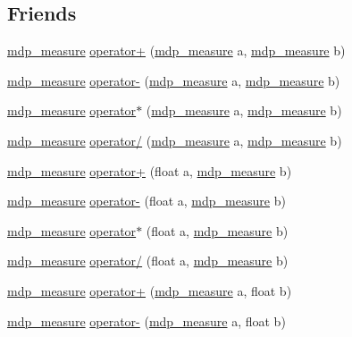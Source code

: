 \subsection*{Friends}
\begin{DoxyCompactItemize}
\item 
\hyperlink{classmdp__measure}{mdp\+\_\+measure} \hyperlink{classmdp__measure_a1550c5a752f0e131323a0571cb75a1ed}{operator+} (\hyperlink{classmdp__measure}{mdp\+\_\+measure} a, \hyperlink{classmdp__measure}{mdp\+\_\+measure} b)
\item 
\hyperlink{classmdp__measure}{mdp\+\_\+measure} \hyperlink{classmdp__measure_a4b29a5d9a8875501a415f73167d8c1ad}{operator-\/} (\hyperlink{classmdp__measure}{mdp\+\_\+measure} a, \hyperlink{classmdp__measure}{mdp\+\_\+measure} b)
\item 
\hyperlink{classmdp__measure}{mdp\+\_\+measure} \hyperlink{classmdp__measure_a51d0c9145c4abafae65590ed2076a438}{operator$\ast$} (\hyperlink{classmdp__measure}{mdp\+\_\+measure} a, \hyperlink{classmdp__measure}{mdp\+\_\+measure} b)
\item 
\hyperlink{classmdp__measure}{mdp\+\_\+measure} \hyperlink{classmdp__measure_a662fb1d8c18de9dc82182a67a082f24d}{operator/} (\hyperlink{classmdp__measure}{mdp\+\_\+measure} a, \hyperlink{classmdp__measure}{mdp\+\_\+measure} b)
\item 
\hyperlink{classmdp__measure}{mdp\+\_\+measure} \hyperlink{classmdp__measure_a46628db42ccf7c2dd255a4babe524da2}{operator+} (float a, \hyperlink{classmdp__measure}{mdp\+\_\+measure} b)
\item 
\hyperlink{classmdp__measure}{mdp\+\_\+measure} \hyperlink{classmdp__measure_ad0854fb690a3213c1263755d4cfbeb29}{operator-\/} (float a, \hyperlink{classmdp__measure}{mdp\+\_\+measure} b)
\item 
\hyperlink{classmdp__measure}{mdp\+\_\+measure} \hyperlink{classmdp__measure_a6d162e2b91ef6637df21622f658e13b9}{operator$\ast$} (float a, \hyperlink{classmdp__measure}{mdp\+\_\+measure} b)
\item 
\hyperlink{classmdp__measure}{mdp\+\_\+measure} \hyperlink{classmdp__measure_acac38148dfa66a6b1c40a18896778bbb}{operator/} (float a, \hyperlink{classmdp__measure}{mdp\+\_\+measure} b)
\item 
\hyperlink{classmdp__measure}{mdp\+\_\+measure} \hyperlink{classmdp__measure_aa394587b2c7e09685b687bcc2b78f9ba}{operator+} (\hyperlink{classmdp__measure}{mdp\+\_\+measure} a, float b)
\item 
\hyperlink{classmdp__measure}{mdp\+\_\+measure} \hyperlink{classmdp__measure_aa1d61cccc59a965eedf6ecb2fb877ea0}{operator-\/} (\hyperlink{classmdp__measure}{mdp\+\_\+measure} a, float b)

\end{DoxyCompactItemize}
